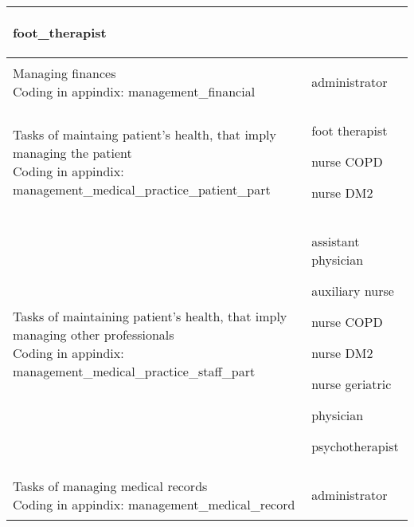 \documentclass[12pt,a4paper,oneside]{article}
\begin{document}
\begin{table}
\begin{tabularx}{\textwidth}{|X|X|}
{\begin{itemize}
{ \item foot\_therapist}
\vspace{-.5em}\end{itemize}}\\
\hline
Managing finances
{\newline\tiny Coding in appindix: {management\_financial}}&{\begin{itemize}
\vspace{-1.5em}\setlength\itemsep{0em}
{ \item administrator}
\vspace{-.5em}\end{itemize}}\\
\hline
Tasks of maintaing patient's health, that imply managing the patient
{\newline\tiny Coding in appindix:\newline {management\_medical\_practice\_patient\_part}}&{\begin{itemize}
\vspace{-1.5em}\setlength\itemsep{0em}
{ \item foot therapist}
{ \item nurse COPD}
{ \item nurse DM2}
\vspace{-.5em}\end{itemize}}\\
\hline
Tasks of maintaining patient's health, that imply managing other professionals
{\newline\tiny Coding in appindix: {management\_medical\_practice\_staff\_part}}&{\begin{itemize}
\vspace{-1.5em}\setlength\itemsep{0em}
{ \item assistant physician}
{ \item auxiliary nurse }
{ \item nurse COPD}
{ \item nurse DM2}
{ \item nurse geriatric}
{ \item physician}
{ \item psychotherapist}
\vspace{-.5em}\end{itemize}}\\
\hline
Tasks of managing medical records
{\newline\tiny Coding in appindix: {management\_medical\_record}}&{\begin{itemize}
\vspace{-1.5em}\setlength\itemsep{0em}
{ \item administrator}
\vspace{-.5em}\end{itemize}}\\
\hline
\end{tabularx}
\end{table}
\end{document}
